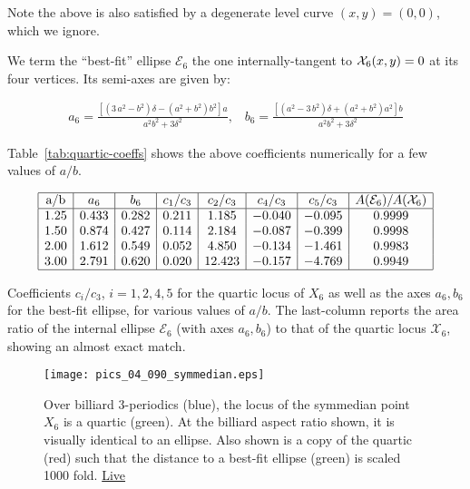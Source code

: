  \noindent Note the above is also satisfied by a degenerate level curve $(x,y)=(0,0)$, which we ignore.

\begin{remark}
We term the ``best-fit'' ellipse $\mathcal{E}_6$ the one internally-tangent to $\mathcal{X}_6(x,y)=0$ at its four vertices. Its semi-axes are given by: 

{\small  
\begin{align*}
a_6= \frac{\left[(3\,a^2-b^2)\delta -(a^2+b^2)b^2\right]a}{a^2b^2+3\delta^2},\;\;\;
b_6= \frac{\left[(a^2-3\,b^2)\delta + (a^2+b^2)a^2\right]b}{a^2b^2+3\delta^2}
\label{eqn:x6-ellipse}
\end{align*}
}
\end{remark}

Table~\ref{tab:quartic-coeffs} shows the above coefficients numerically for a few values of $a/b$.

\begin{table}
    \centering
$$
\begin{array}{|c|c|c|c|c|c|c|c|}
\hline
 \text{a/b} & a_6 & b_6 & c_1/c_3 & c_2/c_3 & c_4/c_3 & c_5/c_3 & A(\mathcal{E}_6)/A(\mathcal{X}_6) \\
 \hline
  1.25 & 0.433 & 0.282 & 0.211 & 1.185 & -0.040 & -0.095 & 0.9999 \\
 1.50 & 0.874 & 0.427 & 0.114 & 2.184 & -0.087 & -0.399 & 0.9998 \\
 2.00 & 1.612 & 0.549 & 0.052 & 4.850 & -0.134 & -1.461 & 0.9983 \\
 3.00 & 2.791 & 0.620 & 0.020 & 12.423 & -0.157 & -4.769 & 0.9949 \\
 \hline
\end{array}
$$
\caption{Coefficients $c_i/c_3$, $i=1,2,4,5$ for the quartic locus of $X_6$ as well as the axes $a_6,b_6$ for the best-fit ellipse, for various values of $a/b$. The last-column reports the area ratio of the internal ellipse $\mathcal{E}_6$ (with axes $a_6,b_6$) to that of the quartic locus $\mathcal{X}_6$, showing an almost exact match.}
\label{tab:quartic-coeffs}
\end{table}


\begin{figure}
    \centering
    \texttt{[image: pics\_04\_090\_symmedian.eps]}
    \caption{Over billiard 3-periodics (blue), the locus of the symmedian point $X_6$ is a quartic (green). At the billiard aspect ratio shown, it is visually identical to an ellipse. Also shown is a copy of the quartic (red) such that the distance to a best-fit ellipse (green) is scaled 1000 fold. \href{https://bit.ly/3hxOZoV}{Live}}
    \label{fig:04-locus-x6}
\end{figure}

